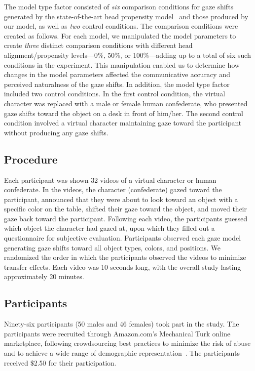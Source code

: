 The model type factor consisted of \emph{six} comparison conditions for gaze shifts generated by the state-of-the-art head propensity model~\citep{peters2010animating} and those produced by our model, as well as \emph{two} control conditions. The comparison conditions were created as follows. For each model, we manipulated the model parameters to create \emph{three} distinct comparison conditions with different head alignment/propensity levels---0\%, 50\%, or 100\%---adding up to a total of six such conditions in the experiment. This manipulation enabled us to determine how changes in the model parameters affected the communicative accuracy and perceived naturalness of the gaze shifts. In addition, the model type factor included two control conditions. In the first control condition, the virtual character was replaced with a male or female human confederate, who presented gaze shifts toward the object on a desk in front of him/her. The second control condition involved a virtual character maintaining gaze toward the participant without producing any gaze shifts.

\subsection{Procedure}

Each participant was shown 32 videos of a virtual character or human confederate. In the videos, the character (confederate) gazed toward the participant, announced that they were about to look toward an object with a specific color on the table, shifted their gaze toward the object, and moved their gaze back toward the participant. Following each video, the participants guessed which object the character had gazed at, upon which they filled out a questionnaire for subjective evaluation. Participants observed each gaze model generating gaze shifts toward all object types, colors, and positions. We randomized the order in which the participants observed the videos to minimize transfer effects. Each video was 10 seconds long, with the overall study lasting approximately 20 minutes.

\subsection{Participants}

Ninety-six participants (50 males and 46 females) took part in the study. The participants were recruited through Amazon.com's Mechanical Turk online marketplace, following crowdsourcing best practices to minimize the risk of abuse and to achieve a wide range of demographic representation~\citep{kittur2008crowdsourcing}. The participants received $\$$2.50 for their participation.

